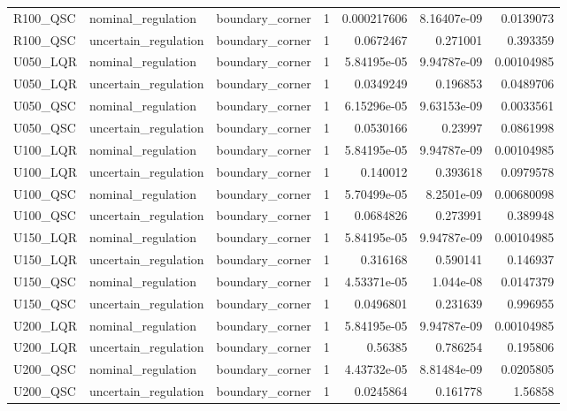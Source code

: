 \begin{tabular}{llllrrr}
R100\_QSC & nominal\_regulation & boundary\_corner & 1 & 0.000217606 & 8.16407e-09 & 0.0139073 \\
R100\_QSC & uncertain\_regulation & boundary\_corner & 1 & 0.0672467 & 0.271001 & 0.393359 \\
U050\_LQR & nominal\_regulation & boundary\_corner & 1 & 5.84195e-05 & 9.94787e-09 & 0.00104985 \\
U050\_LQR & uncertain\_regulation & boundary\_corner & 1 & 0.0349249 & 0.196853 & 0.0489706 \\
U050\_QSC & nominal\_regulation & boundary\_corner & 1 & 6.15296e-05 & 9.63153e-09 & 0.0033561 \\
U050\_QSC & uncertain\_regulation & boundary\_corner & 1 & 0.0530166 & 0.23997 & 0.0861998 \\
U100\_LQR & nominal\_regulation & boundary\_corner & 1 & 5.84195e-05 & 9.94787e-09 & 0.00104985 \\
U100\_LQR & uncertain\_regulation & boundary\_corner & 1 & 0.140012 & 0.393618 & 0.0979578 \\
U100\_QSC & nominal\_regulation & boundary\_corner & 1 & 5.70499e-05 & 8.2501e-09 & 0.00680098 \\
U100\_QSC & uncertain\_regulation & boundary\_corner & 1 & 0.0684826 & 0.273991 & 0.389948 \\
U150\_LQR & nominal\_regulation & boundary\_corner & 1 & 5.84195e-05 & 9.94787e-09 & 0.00104985 \\
U150\_LQR & uncertain\_regulation & boundary\_corner & 1 & 0.316168 & 0.590141 & 0.146937 \\
U150\_QSC & nominal\_regulation & boundary\_corner & 1 & 4.53371e-05 & 1.044e-08 & 0.0147379 \\
U150\_QSC & uncertain\_regulation & boundary\_corner & 1 & 0.0496801 & 0.231639 & 0.996955 \\
U200\_LQR & nominal\_regulation & boundary\_corner & 1 & 5.84195e-05 & 9.94787e-09 & 0.00104985 \\
U200\_LQR & uncertain\_regulation & boundary\_corner & 1 & 0.56385 & 0.786254 & 0.195806 \\
U200\_QSC & nominal\_regulation & boundary\_corner & 1 & 4.43732e-05 & 8.81484e-09 & 0.0205805 \\
U200\_QSC & uncertain\_regulation & boundary\_corner & 1 & 0.0245864 & 0.161778 & 1.56858 \\
\hline
\end{tabular}
